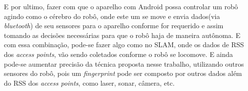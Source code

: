   E por ultimo, fazer com que o aparelho com Android possa controlar 
  um robô agindo como o cérebro do robô, onde este um
  se move e envia dados(via \textit{bluetooth}) de seu sensores para o aparelho conforme for 
  requerido e assim tomando as decisões necessárias para
  que o robô haja de maneira autônoma. E com essa combinação, pode-se fazer algo como no SLAM, 
  onde os dados de RSS dos \textit{access points}, vão sendo coletados conforme o robô se locomove.
  E ainda pode-se aumentar precisão da técnica proposta nesse trabalho, utilizando 
  outros sensores do robô, pois um \textit{fingerprint} pode ser composto por outros dados
   além do RSS dos \textit{access points}, como laser, sonar, câmera, etc.
\begin{comment}
    As possibilidades de trabalhos futuros são enormes. Primeiro poderia implantar o modelo de propagação
de sinal, proposto no artigo \cite{wifiRadar}. Nele são levados em consideração
diversas variáveis para sua elaboração, sendo que a mais importante delas é a quantidade de obstáculos que estão 
entre o transmissor de sinal (Access Point) e o receptor (terminal móvel).
Com base nesse parâmetro, uma equação da distância em função da força de sinal recebido
poderá ser deduzida, que será útil para os cálculos da posição e rastreamento
do terminal móvel. Ou ainda combinar técnicas baseadas em RSS com as tecnologias já largamente empregadas, tais como o GPS.
    
    
    Poderia também, ao contrário do sistema proposto, tratar a possibilidade de não haver um mapa do ambiente, e utilizar técnicas que lidam com o SLAM, 
    como nos artigos \cite{construcaoMapas2}\cite{construcaoMapas}\cite{slam}. E utilizar um algoritmo de planejamento de trajetos mais robusto 
    como o proposto em \cite{voronoi}, que utiliza diagrama de Voronoi para criar um \textit{roadmap}. E ainda ao invés de usar um simples sonar para detectar
     obstáculos, utilizar a câmera do tablet.
     
     Podemos aumentar a escala e ao invés de utilizar um simples robô de 40 cm dentro de um prédio, utilizar o sistema de navegação em um carro, 
      em um ambiente maior \cite{googleCar}.
\end{comment}
